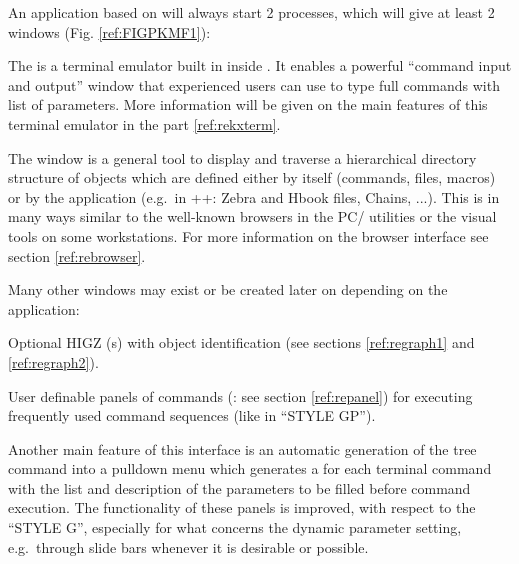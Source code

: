 An application based on \KUIPMotif{} will always start 2 processes, which
will give at least 2 windows (Fig. \ref{ref:FIGPKMF1}):
\begin{UL}
\item
The \EW{}  is a terminal emulator built in inside \KUIP{}. It 
enables a powerful ``command input and output'' window that experienced
users can use to type full commands with list of parameters. More information
will be given on the main features of this terminal emulator in the part 
\ref{ref:rekxterm}.
\item
The \MB{}  window is a general tool to display and traverse
a hierarchical directory structure of objects which are defined either
by \KUIP{} itself (commands, files, macros) or by the application (e.g.\ in 
\PAW++{}: Zebra and Hbook files, Chains, ...). This is in many ways similar to
the well-known browsers in the PC/ utilities or the visual tools on some
workstations. For more information on the 
browser interface see section \ref{ref:rebrowser}.
\end{UL}

Many other windows may exist or be created later on depending on the 
application:
\begin{UL}
\item
Optional HIGZ \GW(s)  with object identification (see 
sections \ref{ref:regraph1} and \ref{ref:regraph2}).
\item
User definable panels of commands  (\PNI{}: see section 
\ref{ref:repanel}) for 
executing frequently used command sequences (like in ``STYLE GP'').
\end{UL}

Another main feature of this interface is an automatic generation of the
tree command into a pulldown menu which generates a \CAP{}
for each terminal command with the list and description of the parameters to
be filled before command execution. The functionality of these panels is
improved, with respect to the ``STYLE G'', especially for what concerns the
dynamic parameter setting, e.g.\ through slide bars whenever it is desirable
or possible.

